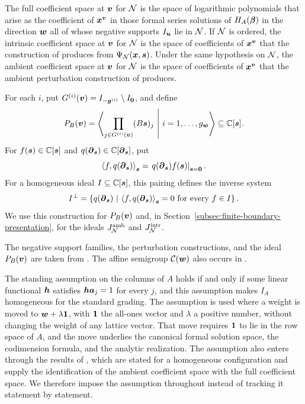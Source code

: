 The full coefficient space at \(\boldsymbol{v}\) for \(\mathcal N\) is the space of logarithmic polynomials that arise as the coefficient of \(\boldsymbol{x}^{\boldsymbol{v}}\) in those formal series solutions of \(H_A(\boldsymbol{\beta})\) in the direction \(\boldsymbol{w}\) all of whose negative supports \(I_{\boldsymbol{u}}\) lie in \(\mathcal N\).
If \(\mathcal N\) is ordered, the intrinsic coefficient space at \(\boldsymbol{v}\) for \(\mathcal N\) is the space of coefficients of \(\boldsymbol{x}^{\boldsymbol{v}}\) that the construction of \cite[Theorem~3.2]{OS25} produces from \(\Psi_{\mathcal N}(\boldsymbol{x},\boldsymbol{s})\).
Under the same hypothesis on \(\mathcal N\), the ambient coefficient space at \(\boldsymbol{v}\) for \(\mathcal N\) is the space of coefficients of \(\boldsymbol{x}^{\boldsymbol{v}}\) that the ambient perturbation construction of \cite[Theorem~5.5]{OS25} produces.

For each \(i\), put \(G^{(i)}(\boldsymbol{v}) =I_{-\boldsymbol{g}^{(i)}}\setminus I_{\boldsymbol{0}}\), and define
\[
	P_B(\boldsymbol{v})
	=
	\left\langle
	\prod_{j\in G^{(i)}(\boldsymbol{v})}(B\boldsymbol{s})_j
	\ \middle|\
	i=1,\ldots,g_{\boldsymbol{w}}
	\right\rangle
	\subseteq\mathbb C[\boldsymbol{s}].
\]
For \(f(\boldsymbol{s})\in\mathbb C[\boldsymbol{s}]\) and \(q(\boldsymbol{\partial}_{\boldsymbol{s}})\in\mathbb C[\boldsymbol{\partial}_{\boldsymbol{s}}]\), put
\[
	\left\langle f,q(\boldsymbol{\partial}_{\boldsymbol{s}})\right\rangle_{\boldsymbol{s}}
	=
	\left.q(\boldsymbol{\partial}_{\boldsymbol{s}})f(\boldsymbol{s})\right|_{\boldsymbol{s}=\boldsymbol{0}}.
\]
For a homogeneous ideal \(I\subseteq\mathbb C[\boldsymbol{s}]\), this pairing defines the inverse system
\[
	I^\perp
	=
	\left\{
	q(\boldsymbol{\partial}_{\boldsymbol{s}})
	\ \middle|\
	\left\langle f,q(\boldsymbol{\partial}_{\boldsymbol{s}})\right\rangle_{\boldsymbol{s}}=0
	\text{ for every }f\in I
	\right\}.
\]
We use this construction for \(P_B(\boldsymbol{v})\) and, in Section~\ref{subsec:finite-boundary-presentation}, for the ideals \(J_{\mathcal N}^{\mathrm{amb}}\) and \(J_{\mathcal N}^{\mathrm{intr}}\).

The negative support families, the perturbation constructions, and the ideal \(P_B(\boldsymbol{v})\) are taken from \cite{Sai20,OS22,OS25}.
The affine semigroup \(\mathcal C(\boldsymbol{w})\) also occurs in \cite{Nag26}.

\begin{remark}
	\label{rem:homogeneity-scope}
	The standing assumption on the columns of \(A\) holds if and only if some linear functional \(\boldsymbol{h}\) satisfies \(\boldsymbol{h}\boldsymbol{a}_j=1\) for every \(j\), and this assumption makes \(I_A\) homogeneous for the standard grading.
	The assumption is used where a weight is moved to \(\boldsymbol{w}+\lambda\boldsymbol{1}\), with \(\boldsymbol{1}\) the all-ones vector and \(\lambda\) a positive number, without changing the weight of any lattice vector.
	That move requires \(\boldsymbol{1}\) to lie in the row space of \(A\), and the move underlies the canonical formal solution space, the codimension formula, and the analytic realization.
	The assumption also enters through the results of \cite{OS25}, which are stated for a homogeneous configuration and supply the identification of the ambient coefficient space with the full coefficient space.
	We therefore impose the assumption throughout instead of tracking it statement by statement.
\end{remark}

